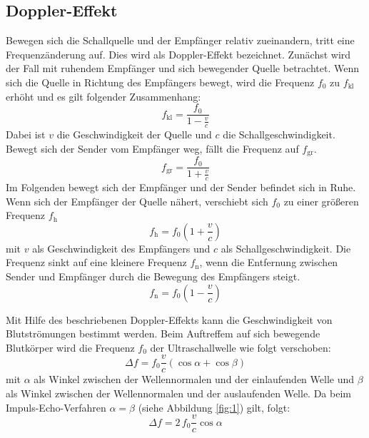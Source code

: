\subsection{Doppler-Effekt}
Bewegen sich die Schallquelle und der Empfänger relativ zueinandern, tritt eine Frequenzänderung auf. Dies wird als Doppler-Effekt bezeichnet.
Zunächst wird der Fall mit ruhendem Empfänger und sich bewegender Quelle betrachtet. Wenn sich die Quelle in Richtung des Empfängers bewegt, wird die Frequenz $f_0$ zu $f_\mathrm{kl}$ erhöht und es gilt folgender Zusammenhang:
\begin{equation}
  f_\mathrm{kl} = \frac{f_0}{1-\frac{v}{c}}
\end{equation}
Dabei ist $v$ die Geschwindigkeit der Quelle und $c$ die Schallgeschwindigkeit.
Bewegt sich der Sender vom Empfänger weg, fällt die Frequenz auf $f_\mathrm{gr}$.
\begin{equation}
  f_\mathrm{gr} = \frac{f_0}{1+\frac{v}{c}}
\end{equation}
Im Folgenden bewegt sich der Empfänger und der Sender befindet sich in Ruhe. Wenn sich der Empfänger der Quelle nähert, verschiebt sich $f_0$ zu einer größeren Frequenz $f_\mathrm{h}$
\begin{equation}
  f_\mathrm{h} = f_0\left(1+\frac{v}{c}\right)
\end{equation}
mit  $v$ als Geschwindigkeit des Empfängers und $c$ als Schallgeschwindigkeit.
Die Frequenz sinkt auf eine kleinere Frequenz $f_\mathrm{n}$, wenn die Entfernung zwischen Sender und Empfänger durch die Bewegung des Empfängers steigt.
\begin{equation}
  f_\mathrm{n} =f_0\left(1-\frac{v}{c}\right)
\end{equation}

Mit Hilfe des beschriebenen Doppler-Effekts kann die Geschwindigkeit von Blutströmungen bestimmt werden. Beim Auftreffem auf sich bewegende Blutkörper wird die Frequenz $f_0$ der Ultraschallwelle wie folgt verschoben:
\begin{equation}
  \Delta f = f_0 \frac{v}{c}(\cos\alpha + \cos\beta)
\end{equation}
mit $\alpha$ als Winkel zwischen der Wellennormalen und der einlaufenden Welle und $\beta$ als Winkel zwischen der Wellennormalen und der auslaufenden Welle. Da beim Impuls-Echo-Verfahren $\alpha = \beta$ (siehe Abbildung \ref{fig:1}) gilt, folgt:
\begin{equation}
  \label{eqn:delta_f}
  \Delta f = 2\,f_0\frac{v}{c}\cos\alpha
\end{equation}

